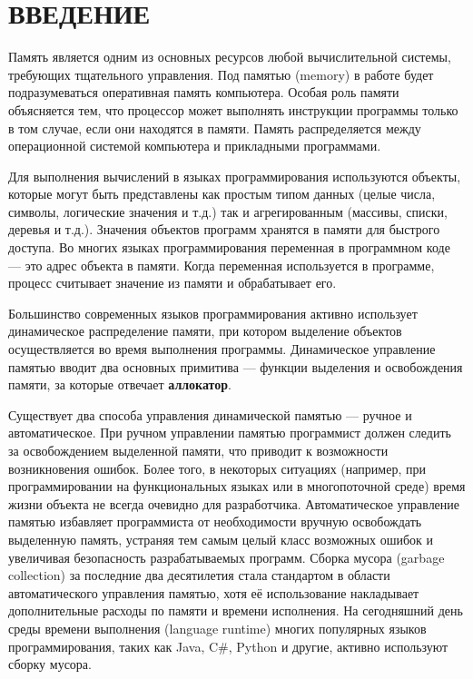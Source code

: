 \part*{ВВЕДЕНИЕ}

Память является одним из основных ресурсов любой вычислительной системы, требующих тщательного управления. Под памятью (memory) в работе будет подразумеваться оперативная память компьютера. Особая роль памяти объясняется тем, что процессор может выполнять инструкции программы только в том случае, если они находятся в памяти. Память распределяется между операционной системой компьютера и прикладными программами. \cite{tannenbaum}

Для выполнения вычислений в языках программирования используются объекты, которые могут быть представлены как простым типом данных (целые числа, символы, логические значения и т.д.) так и агрегированным (массивы, списки, деревья и т.д.). Значения объектов программ хранятся в памяти для быстрого доступа. Во многих языках программирования переменная в программном коде --- это адрес объекта в памяти. \cite{c} \cite{cpp} \cite{golang} Когда переменная используется в программе, процесс считывает значение из памяти и обрабатывает его.

Большинство современных языков программирования активно использует динамическое распределение памяти, при котором выделение объектов осуществляется во время выполнения программы. Динамическое управление памятью вводит два основных примитива --- функции выделения и освобождения памяти, за которые отвечает \textbf{аллокатор}. 

Существует два способа управления динамической памятью --- ручное и автоматическое. При ручном управлении памятью программист должен следить за освобождением выделенной памяти, что приводит к возможности возникновения ошибок. Более того, в некоторых ситуациях (например, при программировании на функциональных языках или в многопоточной среде) время жизни объекта не всегда очевидно для разработчика. \cite{elixir} Автоматическое управление памятью избавляет программиста от необходимости вручную освобождать выделенную память, устраняя тем самым целый класс возможных ошибок и увеличивая безопасность разрабатываемых программ. Сборка мусора (garbage collection) за последние два десятилетия стала стандартом в области автоматического управления памятью, хотя её использование накладывает дополнительные расходы по памяти и времени исполнения. На сегодняшний день среды времени выполнения (language runtime) многих популярных языков программирования, таких как Java, C\#, Python и другие, активно используют сборку мусора. 

